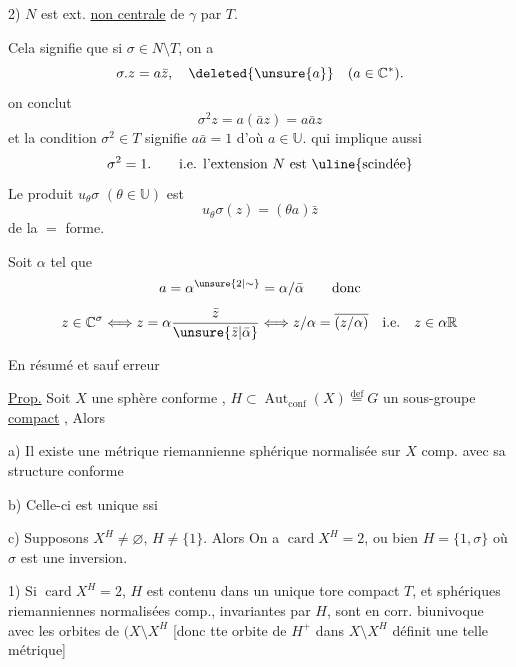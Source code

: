 2) $N$ est ext. \uline{non centrale} de $\gamma$ par $T$.

Cela signifie que si $\sigma\in N\setminus T$, on a
\[
\sigma.z=a\bar z,\quad\deleted{\unsure{a}}\quad(a\in\mathbb C^*).
\]
 on conclut
\[
\sigma^2z=a(\bar a z)=a\bar a z
\]
et la condition $\sigma^2\in T$ signifie $a\bar a=1$ d'où $a\in\mathbb U$. qui implique aussi 
\[
\sigma^2=1.\qquad\text{i.e. l'extension }N\text{ est \uline{scindée}}
\]
Le produit $u_\theta\sigma$ $(\theta\in\mathbb U)$ est
\[
u_\theta\sigma(z)=(\theta a)\bar z
\]
de la $=$ forme.

Soit $\alpha$ tel que
\[
a=\alpha^{\unsure{2|\sim}}=\alpha/\bar\alpha\qquad\text{donc}
\]
\[
z\in\mathbb C^\sigma\Longleftrightarrow z=\alpha\frac{\bar z}{\unsure{\bar z|\bar\alpha}}\Longleftrightarrow z/\alpha=\overline{(z/\alpha)}\quad\text{i.e.}\quad z\in\alpha\mathbb R
\]

En résumé et sauf erreur

\uline{Prop.} Soit $X$ une sphère conforme , $H\subset\operatorname{Aut}_{\mathrm{conf}}(X)\overset{\mathrm{def}}=G$ un sous-groupe \uline{compact} , Alors

a) Il existe une métrique riemannienne sphérique normalisée sur $X$ comp. avec sa structure conforme

b) Celle-ci est unique ssi 

 c) Supposons  $X^H\ne\varnothing$, $H\ne\{1\}$. Alors On a  $\operatorname{card}X^H=2$, ou bien $H=\{1,\sigma\}$ où $\sigma$ est une inversion.

1) Si $\operatorname{card}X^H=2$,  $H$ est contenu dans un unique tore compact $T$, et  sphériques riemanniennes normalisées comp., invariantes par  $H$, sont en corr. biunivoque avec les orbites de $(X\setminus X^H$ [donc tte orbite de  $H^+$ dans $X\setminus X^H$ définit une telle métrique]

